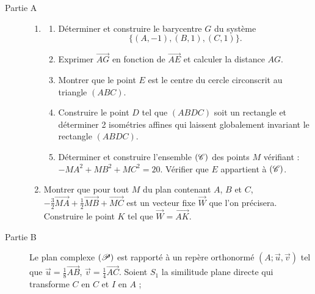       \begin{description}
            \item[Partie A]
                  \begin{enumerate}
                        \item \begin{enumerate}
                                    \item D\'eterminer et construire le barycentre $G$ du syst\`eme
                                          \[
                                            \{(A,-1),(B,1),(C,1)\}.
                                          \]
                                    \item Exprimer $\overrightarrow{AG}$ en fonction de $\overrightarrow{AE}$ et 
                                          calculer la distance $AG$.
                                    \item Montrer que le point $E$ est le centre du cercle circonscrit au triangle $(ABC)$.
                                    \item Construire le point $D$ tel que $(ABDC)$ soit un rectangle et d\'eterminer 2 
                                          isom\'etries affines qui laissent globalement invariant le rectangle $(ABDC)$.
                                    \item D\'eterminer et construire l'ensemble $(\mathscr{C})$ des points $M$ v\'erifiant : 
                                          $- MA^2 + MB^2 + MC^2 = 20$.
                                          V\'erifier que $E$ appartient \`a $(\mathscr{C})$.
                              \end{enumerate}
                        \item Montrer que pour tout $M$ du plan contenant $A$, $B$ et $C$, 
                              $- \frac{3}{2} \overrightarrow{MA} + \frac{1}{2} \overrightarrow{MB} + \overrightarrow{MC}$
                              est un vecteur fixe $\overrightarrow{W}$ que l'on pr\'ecisera.
                              Construire le point $K$ tel que $\overrightarrow{W} = \overrightarrow{AK}$.
                  \end{enumerate}
            \item[Partie B]
                  Le plan complexe $(\mathscr{P})$ est rapport\'e \`a un rep\`ere orthonorm\'e $(A;\vec{u},\vec{v})$ tel que
                  $\vec{u} = \frac{1}{8} \overrightarrow{AB}$, $\vec{v} = \frac{1}{4} \overrightarrow{AC}$.
                  Soient $S_1$ la similitude plane directe qui transforme $C$ en $C$ et $I$ en $A$ ;

\end{description}
